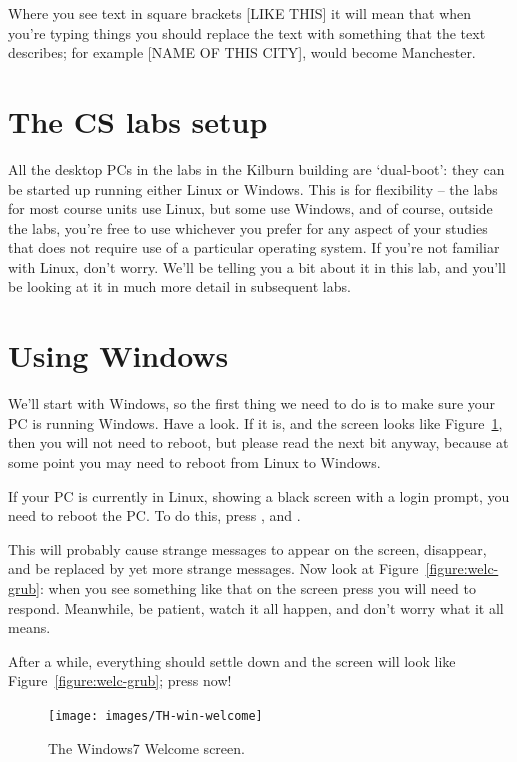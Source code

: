 Where you see text in square brackets [LIKE THIS] it will mean that
when you're typing things you should replace the text with something
that the text describes; for example [NAME OF THIS CITY], would become
Manchester.

\section{The CS labs setup}

All the desktop PCs in the labs in the Kilburn building are
`dual-boot': they can be started up running either Linux or
Windows. This is for flexibility -- the labs for most course units use
Linux, but some use Windows, and of course, outside the labs, you're
free to use whichever you prefer for any aspect of your studies that
does not require use of a particular operating system. If you're not
familiar with Linux, don't worry. We'll be telling you a bit about it
in this lab, and you'll be looking at it in much more detail in
subsequent labs.

\section{Using Windows}
\label{sec:using-windows}

We'll start with Windows, so the first thing we need to do is to make
sure your PC is running Windows. Have a look. If it is, and the screen
looks like Figure~\ref{figure:welc-screen}, then you will not need to
reboot, but please read the next bit anyway, because at some point you
may need to reboot from Linux to Windows.

If your PC is currently in Linux, showing a black screen with a login prompt,  you need to reboot the PC. To do
this, press ,  and .

This will probably cause strange messages to appear on the screen,
disappear, and be replaced by yet more strange messages. Now look at
Figure~\ref{figure:welc-grub}: when you see something like that on the
screen press  you will need to respond. Meanwhile, be
patient, watch it all happen, and don't worry what it all means.

After a while,
everything should settle down and the screen will look like
Figure~\ref{figure:welc-grub}; press  now!

\begin{figure}
\centerline{\texttt{[image: images/TH-win-welcome]}}
\caption{The Windows7 Welcome screen.}
\label{figure:welc-screen}
\end{figure}


